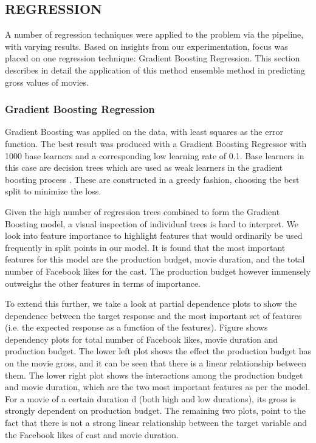 \subsection{REGRESSION}
A number of regression techniques were applied to the problem via the pipeline, with varying results. Based on insights from our experimentation, focus was placed on one regression technique: Gradient Boosting Regression.  This section describes in detail the application of this method ensemble method in predicting gross values of movies. 



\subsubsection{Gradient Boosting Regression}
Gradient Boosting was applied on the data, with least squares as the error function. The best result was produced with a Gradient Boosting Regressor with 1000 base learners and a corresponding low learning rate of 0.1. Base learners in this case are decision trees which are used as weak learners in the gradient boosting process \cite{natekin2013gradient}. These are constructed in a greedy fashion, choosing the best split to minimize the loss. 

Given the high number of regression trees combined to form the Gradient Boosting model, a visual inspection of individual trees is hard to interpret. We look into feature importance to highlight features that would ordinarily be used frequently in split points in our model. It is found that the most important features for this model are the production budget,  movie duration, and the total number of Facebook likes for the cast. The production budget however immensely outweighs the other features in terms of importance. 

To extend this further, we take a look at partial dependence plots to show the dependence between the target response and the most important set of features (i.e. the expected response as a function of the features). Figure shows dependency plots for total number of Facebook likes, movie duration and production budget. The lower left plot shows the effect the production budget has on the movie gross, and it can be seen that there is a linear relationship between them. The lower right plot shows the interactions among the production budget and movie duration, which are the two most important features as per the model. For a movie of a certain duration d (both high and low durations), its gross is strongly dependent on production budget.  The remaining two plots, point to the fact that there is not a strong linear relationship between the target variable and the Facebook likes of cast and movie duration.



